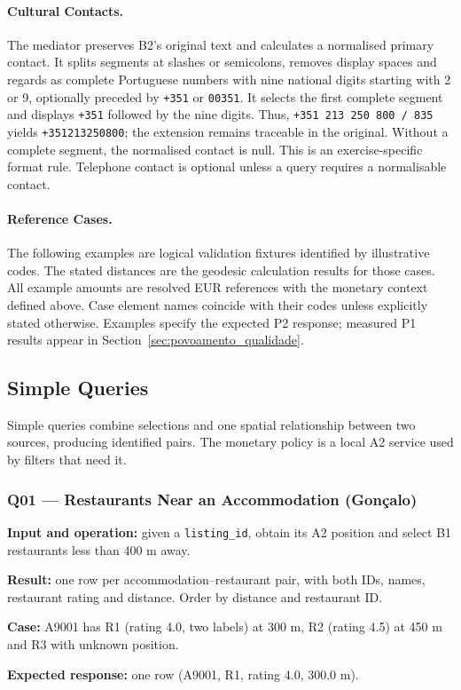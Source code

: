 \paragraph{Cultural Contacts.}
The mediator preserves B2's original text and calculates a normalised primary contact. It splits segments at slashes or semicolons, removes display spaces and regards as complete Portuguese numbers with nine national digits starting with 2 or 9, optionally preceded by \texttt{+351} or \texttt{00351}. It selects the first complete segment and displays \texttt{+351} followed by the nine digits. Thus, \texttt{+351 213 250 800 / 835} yields \texttt{+351213250800}; the extension remains traceable in the original. Without a complete segment, the normalised contact is null. This is an exercise-specific format rule. Telephone contact is optional unless a query requires a normalisable contact.
\paragraph{Reference Cases.}
The following examples are logical validation fixtures identified by illustrative codes. The stated distances are the geodesic calculation results for those cases. All example amounts are resolved EUR references with the monetary context defined above. Case element names coincide with their codes unless explicitly stated otherwise. Examples specify the expected P2 response; measured P1 results appear in Section~\ref{sec:povoamento_qualidade}.
\subsection{Simple Queries}
Simple queries combine selections and one spatial relationship between two sources, producing identified pairs. The monetary policy is a local A2 service used by filters that need it.
\subsubsection{Q01 --- Restaurants Near an Accommodation (Gonçalo)}
\textbf{Input and operation:} given a \texttt{listing\_\allowbreak{}id}, obtain its A2 position and select B1 restaurants less than 400 m away.\par
\textbf{Result:} one row per accommodation--restaurant pair, with both IDs, names, restaurant rating and distance. Order by distance and restaurant ID.\par
\textbf{Case:} A9001 has R1 (rating 4.0, two labels) at 300 m, R2 (rating 4.5) at 450 m and R3 with unknown position.\par
\textbf{Expected response:} one row (A9001, R1, rating 4.0, 300.0 m).
